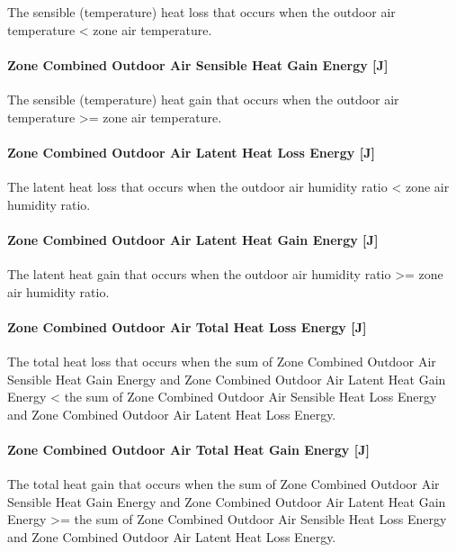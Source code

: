 The sensible (temperature) heat loss that occurs when the outdoor air temperature \textless{} zone air temperature.

\paragraph{Zone Combined Outdoor Air Sensible Heat Gain Energy {[}J{]}}\label{zone-combined-outdoor-air-sensible-heat-gain-energy-j}

The sensible (temperature) heat gain that occurs when the outdoor air temperature \textgreater{}= zone air temperature.

\paragraph{Zone Combined Outdoor Air Latent Heat Loss Energy {[}J{]}}\label{zone-combined-outdoor-air-latent-heat-loss-energy-j}

The latent heat loss that occurs when the outdoor air humidity ratio \textless{} zone air humidity ratio.

\paragraph{Zone Combined Outdoor Air Latent Heat Gain Energy {[}J{]}}\label{zone-combined-outdoor-air-latent-heat-gain-energy-j}

The latent heat gain that occurs when the outdoor air humidity ratio \textgreater{}= zone air humidity ratio.

\paragraph{Zone Combined Outdoor Air Total Heat Loss Energy {[}J{]}}\label{zone-combined-outdoor-air-total-heat-loss-energy-j}

The total heat loss that occurs when the sum of Zone Combined Outdoor Air Sensible Heat Gain Energy and Zone Combined Outdoor Air Latent Heat Gain Energy \textless{} the sum of Zone Combined Outdoor Air Sensible Heat Loss Energy and Zone Combined Outdoor Air Latent Heat Loss Energy.

\paragraph{Zone Combined Outdoor Air Total Heat Gain Energy {[}J{]}}\label{zone-combined-outdoor-air-total-heat-gain-energy-j}

The total heat gain that occurs when the sum of Zone Combined Outdoor Air Sensible Heat Gain Energy and Zone Combined Outdoor Air Latent Heat Gain Energy \textgreater{}= the sum of Zone Combined Outdoor Air Sensible Heat Loss Energy and Zone Combined Outdoor Air Latent Heat Loss Energy.

